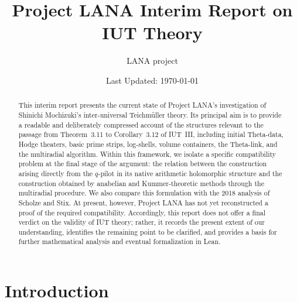 \documentclass[12pt, reqno, a4paper]{amsart}
\title{Project LANA Interim Report on IUT Theory}
\author{LANA project}
\date{Last Updated: \today}
\begin{document}
\theoremstyle{plain}
\newtheorem{thm}{Theorem}[subsection]
\newtheorem{prop}[thm]{Proposition}
\newtheorem{lem}[thm]{Lemma}
\newtheorem{cor}[thm]{Corollary}
\newtheorem{cla}[thm]{Claim}
\newtheorem{assum}[thm]{Assumption}
\theoremstyle{definition}
\newtheorem{dfn}[thm]{Definition}
\newtheorem{ntn}[thm]{Notation}
\newtheorem{exa}[thm]{Example}
\newtheorem{sit}[thm]{Situation}
\theoremstyle{remark}
\newtheorem{rem}[thm]{Remark}
\newtheorem{note}[thm]{Note}

\renewcommand{\thesubsubsection}{\thesubsection\,(\alph{subsubsection})}
\renewcommand{\theequation}{\thesection-\arabic{equation}}

\begin{abstract}
This interim report presents the current state of Project LANA's investigation
of Shinichi Mochizuki's inter-universal Teichm\"uller theory. Its principal aim
is to provide a readable and deliberately compressed account of the structures
relevant to the passage from Theorem~3.11 to Corollary~3.12 of IUT~III,
including initial Theta-data, Hodge theaters, basic prime strips, log-shells,
volume containers, the Theta-link, and the multiradial algorithm. Within this
framework, we isolate a specific compatibility problem at the final stage of
the argument: the relation between the construction arising directly from the
$q$-pilot in its native arithmetic holomorphic structure and the construction
obtained by anabelian and Kummer-theoretic methods through the multiradial
procedure. We also compare this formulation with the 2018 analysis of Scholze
and Stix. At present, however, Project LANA has
not yet reconstructed a proof of the required compatibility. Accordingly, this
report does not offer a final verdict on the validity of IUT theory; rather, it
records the present extent of our understanding, identifies the remaining point
to be clarified, and provides a basis for further mathematical analysis and
eventual formalization in Lean.
\end{abstract}

\maketitle
\setcounter{tocdepth}{1}
\tableofcontents



\setcounter{section}{-1}
\section{Introduction}\label{sec:intro}
\end{document}

